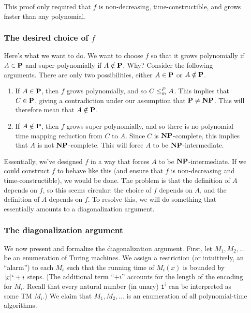 This proof only required that $f$ is non-decreasing, time-constructible, and grows faster than any polynomial.

\subsubsection{The desired choice of $f$}
Here's what we want to do. We want to choose $f$ so that it grows polynomially if $A \in \textbf{P}$ and super-polynomially if $A \notin \textbf{P}$. Why? Consider the following arguments. There are only two possibilities, either $A \in \textbf{P}$ or $A \notin \textbf{P}$.
\begin{enumerate}
  \item If $A \in \textbf{P}$, then $f$ grows polynomially, and so $C \leq_m^P A$. This implies that $C \in \textbf{P}$, giving a contradiction under our assumption that $\textbf{P} \neq \textbf{NP}$. This will therefore mean that $A \notin \textbf{P}$.
  \item If $A \notin \textbf{P}$, then $f$ grows super-polynomially, and so there is no polynomial-time mapping reduction from $C$ to $A$. Since $C$ is $\textbf{NP}$-complete, this implies that $A$ is not $\textbf{NP}$-complete. This will force $A$ to be $\textbf{NP}$-intermediate.
\end{enumerate}

Essentially, we've designed $f$ in a way that forces $A$ to be $\textbf{NP}$-intermediate. If we could construct $f$ to behave like this (and ensure that $f$ is non-decreasing and time-constructible), we would be done. The problem is that the definition of $A$ depends on $f$, so this seems circular: the choice of $f$ depends on $A$, and the definition of $A$ depends on $f$. To resolve this, we will do something that essentially amounts to a diagonalization argument.

\subsubsection{The diagonalization argument}
We now present and formalize the diagonalization argument. First, let $M_1, M_2, \dots$ be an enumeration of Turing machines. We assign a restriction (or intuitively, an ``alarm'') to each $M_i$ such that the running time of $M_i(x)$ is bounded by $| x |^i + i$ steps. (The additional term ``$+ i$'' accounts for the length of the encoding for $M_i$. Recall that every natural number (in unary) $\texttt{1}^i$ can be interpreted as some TM $M_i$.) We claim that $M_1, M_2, \dots$ is an enumeration of all polynomial-time algorithms.

